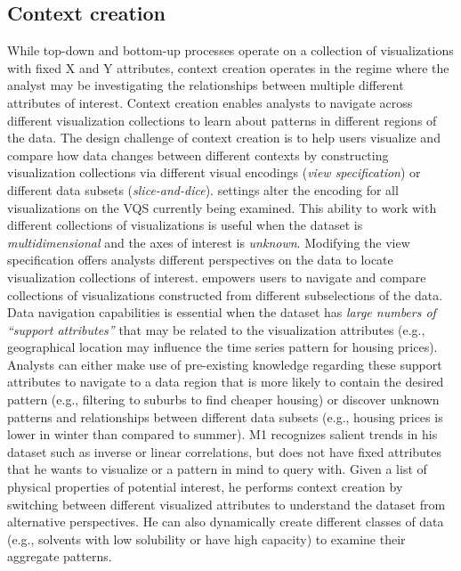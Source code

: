 {  \subsection{Context creation}
  While top-down and bottom-up processes operate on a collection of visualizations with fixed X and Y attributes, context creation operates in the regime where the analyst may be investigating the relationships between multiple different attributes of interest. Context creation enables analysts to navigate across different visualization collections to learn about patterns in different regions of the data. The design challenge of context creation is to help users visualize and compare how data changes between different contexts by constructing visualization collections via different visual encodings (\textit{view specification}) or different data subsets (\textit{slice-and-dice}).%
   settings alter the encoding for all visualizations on the VQS currently being examined. This ability to work with different collections of visualizations is useful when the dataset is \emph{multidimensional} and the axes of interest is \emph{unknown}. Modifying the view specification offers analysts different perspectives on the data to locate visualization collections of interest.
   empowers users to navigate and compare collections of visualizations constructed from different subselections of the data. Data navigation capabilities is essential when the dataset has \emph{large numbers of ``support attributes''} that may be related to the visualization attributes (e.g., geographical location may influence the time series pattern for housing prices). Analysts can either make use of pre-existing knowledge regarding these support attributes to navigate to a data region that is more likely to contain the desired pattern (e.g., filtering to suburbs to find cheaper housing) or discover unknown patterns and relationships between different data subsets (e.g., housing prices is lower in winter than compared to summer).%
   M1 recognizes salient trends in his dataset such as inverse or linear correlations, but does not have fixed attributes that he wants to visualize or a pattern in mind to query with. Given a list of physical properties of potential interest, he performs context creation by switching between different visualized attributes to understand the dataset from alternative perspectives. He can also dynamically create different classes of data (e.g., solvents with low solubility or have high capacity) to examine their aggregate patterns.
}
